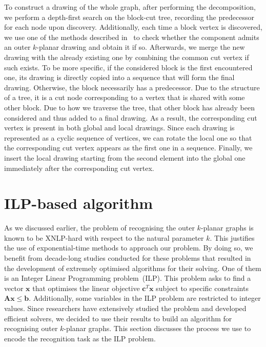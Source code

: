 To construct a drawing of the whole graph, after performing the decomposition, we perform a depth-first search on the block-cut tree, recording the predecessor for each node upon discovery. Additionally, each time a block vertex is discovered, we use one of the methods described in~ to check whether the component admits an outer \(k\)-planar drawing and obtain it if so. Afterwards, we merge the new drawing with the already existing one by combining the common cut vertex if such exists. To be more specific, if the considered block is the first encountered one, its drawing is directly copied into a sequence that will form the final drawing. Otherwise, the block necessarily has a predecessor. Due to the structure of a tree, it is a cut node corresponding to a vertex that is shared with some other block. Due to how we traverse the tree, that other block has already been considered and thus added to a final drawing. As a result, the corresponding cut vertex is present in both global and local drawings. Since each drawing is represented as a cyclic sequence of vertices, we can rotate the local one so that the corresponding cut vertex appears as the first one in a sequence. Finally, we insert the local drawing starting from the second element into the global one immediately after the corresponding cut vertex.


\section{ILP-based algorithm}\label{sec:ILP-def}

As we discussed earlier, the problem of recognising the outer \(k\)-planar graphs is known to be XNLP-hard with respect to the natural parameter \(k\). This justifies the use of exponential-time methods to approach our problem. By doing so, we benefit from decade-long studies conducted for these problems that resulted in the development of extremely optimised algorithms for their solving. One of them is an Integer Linear Programming problem~(ILP). This problem asks to find a vector \(\mathbf{x}\) that optimises the linear objective \(\mathbf{c}^T\mathbf{x}\) subject to specific constraints \(\mathbf{Ax}\leqslant\mathbf{b}\). Additionally, some variables in the ILP problem are restricted to integer values. Since researchers have extensively studied the problem and developed efficient solvers, we decided to use their results to build an algorithm for recognising outer \(k\)-planar graphs. This section discusses the process we use to encode the recognition task as the ILP problem.

